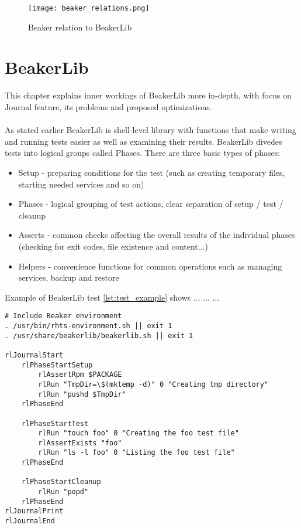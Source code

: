 \begin{figure}[h!]
  \texttt{[image: beaker\_relations.png]}
  \caption{Beaker relation to BeakerLib}
  \label{fig:beaker_relation}
\end{figure}




\chapter{BeakerLib}
This chapter explains inner workings of BeakerLib more in-depth, with focus on Journal feature, its problems and proposed optimizations.
\\
\\
As stated earlier BeakerLib is shell-level library with functions that make writing and running tests easier as well as examining their results. BeakerLib divedes tests into logical groups called Phases. There are three basic types of phases:
\begin{itemize}
\item Setup - preparing conditions for the test (such as creating temporary files, starting needed services and so on)
\item Phases - logical grouping of test actions, clear separation of setup / test / cleanup
\item Asserts - common checks affecting the overall results of the individual phases (checking for exit codes, file existence and content...)
\item Helpers - convenience functions for common operations such as managing services, backup and restore 
\end{itemize}


Example of BeakerLib test \ref{lst:test_example} shows ... ... ...

\begin{lstlisting}[style=beakerlib_bash,caption={BeakerLib basic test example},label={lst:test_example}]
# Include Beaker environment
. /usr/bin/rhts-environment.sh || exit 1
. /usr/share/beakerlib/beakerlib.sh || exit 1

rlJournalStart
    rlPhaseStartSetup
        rlAssertRpm $PACKAGE
        rlRun "TmpDir=\$(mktemp -d)" 0 "Creating tmp directory"
        rlRun "pushd $TmpDir"
    rlPhaseEnd

    rlPhaseStartTest
        rlRun "touch foo" 0 "Creating the foo test file"
        rlAssertExists "foo"
        rlRun "ls -l foo" 0 "Listing the foo test file"
    rlPhaseEnd

    rlPhaseStartCleanup
        rlRun "popd"
    rlPhaseEnd
rlJournalPrint
rlJournalEnd
\end{lstlisting}


